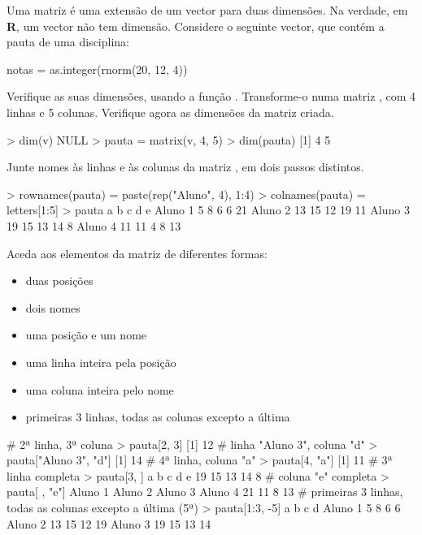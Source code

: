 \documentclass{exam}
\begin{document}
\begin{questions}
\question Uma matriz é uma extensão de um vector para duas dimensões. Na verdade, em \textbf{R}, um vector não tem dimensão. Considere o seguinte vector, que contém a pauta de uma disciplina:
\begin{rcode}
notas = as.integer(rnorm(20, 12, 4))
\end{rcode}
Verifique as suas dimensões, usando a função . Transforme-o numa matriz , com 4 linhas e 5 colunas. Verifique agora as dimensões da matriz criada.

\begin{solution}
	\begin{rcode}
		> dim(v)
		NULL
		> pauta = matrix(v, 4, 5)
		> dim(pauta)
		[1] 4 5
	\end{rcode}
\end{solution}

\question Junte nomes às linhas e às colunas da matriz , em dois passos distintos.

\begin{solution}
	\begin{rcode}
		> rownames(pauta) = paste(rep("Aluno", 4), 1:4)
		> colnames(pauta) = letters[1:5]
		> pauta
		         a  b  c  d  e
		Aluno 1  5  8  6  6 21
		Aluno 2 13 15 12 19 11
		Aluno 3 19 15 13 14  8
		Aluno 4 11 11  4  8 13
	\end{rcode}
\end{solution}

\question Aceda aos elementos da matriz de diferentes formas:
\begin{itemize}
\item duas posições
\item dois nomes
\item uma posição e um nome
\item uma linha inteira pela posição
\item uma coluna inteira pelo nome
\item primeiras 3 linhas, todas as colunas excepto a última
\end{itemize}

\begin{solution}
	\begin{rcode}
		# 2ª linha, 3ª coluna
		> pauta[2, 3]
		[1] 12
		# linha "Aluno 3", coluna "d"
		> pauta["Aluno 3", "d"]
		[1] 14
		# 4ª linha, coluna "a"
		> pauta[4, "a"]
		[1] 11
		# 3ª linha completa
		> pauta[3, ]
		a  b  c  d  e 
		19 15 13 14  8 
		# coluna "e" completa
		> pauta[ , "e"]
		Aluno 1 Aluno 2 Aluno 3 Aluno 4 
		21      11       8      13 
		# primeiras 3 linhas, todas as colunas excepto a última (5ª)
		> pauta[1:3, -5]
		         a  b  c  d
		Aluno 1  5  8  6  6
		Aluno 2 13 15 12 19
		Aluno 3 19 15 13 14
	\end{rcode}
\end{solution}


\end{questions}
\end{document}
